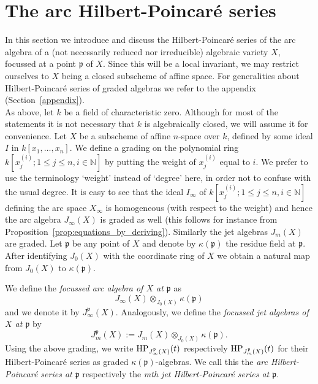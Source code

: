 \section{The arc Hilbert-Poincar\'{e} series}\label{sec:section_3}

In this section we introduce and discuss the Hilbert-Poincar\'{e} series of the arc algebra of a (not necessarily reduced nor irreducible) algebraic variety $X$, focussed at a point $\mathfrak{p}$ of $X$. Since this will be a local invariant, we may restrict ourselves to $X$ being a closed subscheme of affine space. For generalities about Hilbert-Poincar\'{e} series of graded algebras we refer to the appendix (Section~\ref{appendix}).\\

As above, let $k$ be a field of characteristic zero. Although for most of the statements it is not necessary that $k$ is algebraically closed, we will assume it for convenience. Let $X$ be a subscheme of affine $n$-space over $k$, defined by some ideal $I$ in $k[x_1,\ldots , x_n]$. We define a grading on the polynomial ring $k[x_j^{(i)};1\leq j \leq n, i\in  \mathbb{N}]$ by putting the weight of $x_j^{(i)}$ equal to $i$. We prefer to use the terminology `weight' instead of `degree' here, in order not to confuse with the usual degree. It is easy to see that the ideal $I_{\infty}$ of $k[x_j^{(i)};1\leq j \leq n, i\in  \mathbb{N}]$ defining the arc space $X_{\infty}$ is homogeneous (with respect to the weight) and hence the arc algebra $J_{\infty}(X)$ is graded as well (this follows for instance from Proposition~\ref{prop:equations_by_deriving}). Similarly the jet algebras $J_m(X)$ are graded. Let $\mathfrak{p}$ be any point of $X$ and denote by $\kappa(\mathfrak{p})$ the residue field at $\mathfrak{p}$. After identifying $J_0(X)$ with the coordinate ring of $X$ we obtain a natural map from $J_0(X)$ to $\kappa(\mathfrak{p})$. 

\begin{Def}\label{def:arc_Hilbert}
We define the \emph{focussed arc algebra 
of $X$ at $\mathfrak{p}$} as
\[ J_{\infty}(X) \otimes_{J_0(X)} \kappa(\mathfrak{p}) \]
and we denote it by $J_{\infty}^{\mathfrak{p}}(X)$. Analogously, we define the \emph{focussed jet algebras of $X$ at $\mathfrak{p}$} by
\[ J_{m}^{\mathfrak{p}}(X):= J_{m}(X) \otimes_{J_0(X)} \kappa(\mathfrak{p}). \]
Using the above grading, we write $ \operatorname{HP}_{J_{\infty}^{\mathfrak{p}}(X)}(t)$ respectively $\operatorname{HP}_{J_{m}^{\mathfrak{p}}(X)}(t)$ for their Hilbert-Poincar\'{e} series as graded $\kappa(\mathfrak{p})$-algebras. We call this the \emph{arc Hilbert-Poin\-ca\-r\'{e} series at $\mathfrak{p}$} respectively the \emph{mth jet Hilbert-Poincar\'{e} series at $\mathfrak{p}$}.
\end{Def}

